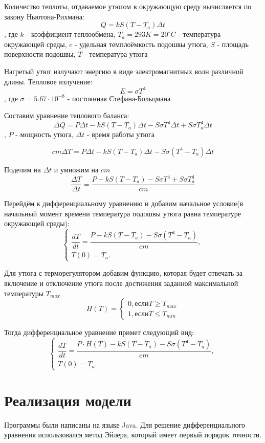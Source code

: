 \documentclass[a4paper, 14pt]{extarticle}
\begin{document}
		Количество теплоты, отдаваемое утюгом в окружающую среду вычисляется по закону Ньютона-Рихмана:
		\[ Q = kS(T-T_a) \Delta t \]
		, где \(k\) - коэффициент теплообмена, $T_a = 293K = 20^{\circ}C$ - температура окружающей среды,
		$c$ - удельная темплоёмкость подошвы утюга, $S$ - площадь поверхности подошвы, $T$ - температура утюга
			
		Нагретый утюг излучают энергию в виде электромагнитных волн различной длины. Тепловое излучение:
		\[ E = \sigma T^4 \]
		, где \( \sigma = 5.67 \cdot 10^{-8} \) - постоянная Стефана-Больцмана
		
		Составим уравнение теплового баланса:
		\[ \Delta Q = P\Delta t - kS(T-T_a) \Delta t - S \sigma T^4 \Delta t +  S \sigma T_a^4 \Delta t\],
		$P$ - мощность утюга, $\Delta t$ - время работы утюга
		
		\[ cm \Delta T = P\Delta t - kS(T-T_a) \Delta t - S \sigma (T^4 - T_a) \Delta t \]
		
		Поделим на \( \Delta t\) и умножим на \(cm\)
		\[ \dfrac{\Delta T}{\Delta t} 
		= \dfrac{P - kS(T-T_a) - S \sigma T^4 +  S \sigma T_a^4}{cm}\]
		
		Перейдём к дифференциальному уравнению и добавим начальное условие(в начальный момент времени
		температура подошвы утюга равна температуре окружающей среды):
		\[
			\begin{cases}
				\dfrac{dT}{dt} = \dfrac{P - kS(T-T_a) - S \sigma (T^4 - T_a)}{cm},\\
				T(0) = T_a.
			\end{cases} \tag{1} \label{eq:1}
		\]
		
		Для утюга с терморегулятором добавим функцию, которая будет отвечать за включение и отключение утюга
		после достижения заданной максимальной температуры $T_{max}$
		\[ H(T) = 
			\begin{cases}
				0, \text{если} T \geq T_{max}\\
				1, \text{если} T \leq T_{min}
			\end{cases} 
		\]
		
		Тогда дифференциальное уравнение примет следующий вид:
		\[
		\begin{cases}
			\dfrac{dT}{dt} = \dfrac{ P\cdot H(T) - kS(T-T_a) - S \sigma (T^4 - T_a)}{cm},\\
			T(0) = T_a.
		\end{cases} \tag{2} \label{eq:2}
		\]
	
	\section{Реализация модели}
		\setlength\parindent{0pt}
		Программы были написаны на языке Java. Для решение дифференциального уравнения
		использовался метод Эйлера, который имеет первый порядок точности.
\end{document}

